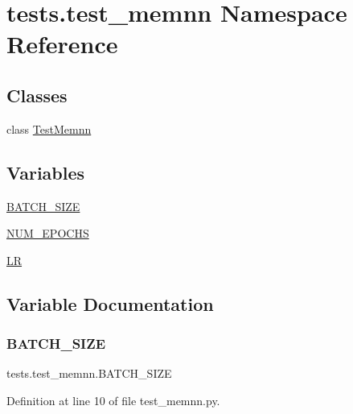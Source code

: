 \hypertarget{namespacetests_1_1test__memnn}{}\section{tests.\+test\+\_\+memnn Namespace Reference}
\label{namespacetests_1_1test__memnn}
\subsection*{Classes}
\begin{DoxyCompactItemize}
\item 
class \hyperlink{classtests_1_1test__memnn_1_1TestMemnn}{Test\+Memnn}
\end{DoxyCompactItemize}
\subsection*{Variables}
\begin{DoxyCompactItemize}
\item 
\hyperlink{namespacetests_1_1test__memnn_a59d316c878d2e3c9367cc659df62aec5}{B\+A\+T\+C\+H\+\_\+\+S\+I\+ZE}
\item 
\hyperlink{namespacetests_1_1test__memnn_a46288002899c2d3500c5b36aced776d4}{N\+U\+M\+\_\+\+E\+P\+O\+C\+HS}
\item 
\hyperlink{namespacetests_1_1test__memnn_a5199eac2aee5546ccdf4bd993ffd18ad}{LR}
\end{DoxyCompactItemize}


\subsection{Variable Documentation}
\mbox{\label{namespacetests_1_1test__memnn_a59d316c878d2e3c9367cc659df62aec5}} 
\subsubsection{\texorpdfstring{B\+A\+T\+C\+H\+\_\+\+S\+I\+ZE}{BATCH\_SIZE}}
{\footnotesize\ttfamily tests.\+test\+\_\+memnn.\+B\+A\+T\+C\+H\+\_\+\+S\+I\+ZE}



Definition at line 10 of file test\+\_\+memnn.\+py.

